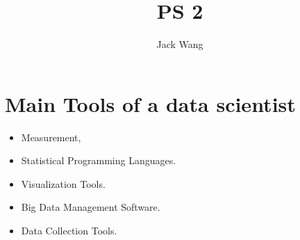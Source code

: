 \documentclass{article}
\title{PS 2}
\author{Jack Wang}
\begin{document}
\maketitle

\section{Main Tools of a data scientist}



\begin{itemize}
\item Measurement,
\item Statistical Programming Languages.
\item Visualization Tools.
\item Big Data Management Software.
\item Data Collection Tools.
\end{itemize}
\end{document}
